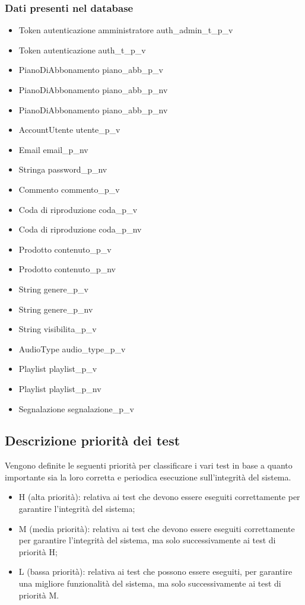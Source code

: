 \subsubsection{Dati presenti nel database}
\begin{itemize}
    \item Token autenticazione amministratore auth\_admin\_t\_p\_v
    \item Token autenticazione auth\_t\_p\_v
    \item PianoDiAbbonamento piano\_abb\_p\_v
    \item PianoDiAbbonamento piano\_abb\_p\_nv
    \item PianoDiAbbonamento piano\_abb\_p\_nv
    \item AccountUtente utente\_p\_v
    \item Email email\_p\_nv
    \item Stringa password\_p\_nv
    \item Commento commento\_p\_v
    \item Coda di riproduzione coda\_p\_v
    \item Coda di riproduzione coda\_p\_nv
    \item Prodotto contenuto\_p\_v
    \item Prodotto contenuto\_p\_nv
    \item String genere\_p\_v
    \item String genere\_p\_nv
    \item String visibilita\_p\_v
    \item AudioType audio\_type\_p\_v
    \item Playlist playlist\_p\_v
    \item Playlist playlist\_p\_nv
    \item Segnalazione segnalazione\_p\_v

\end{itemize}

\subsection{Descrizione priorità dei test}

Vengono definite le seguenti priorità per classificare i vari test in base a quanto importante sia la
loro corretta e periodica esecuzione sull'integrità del sistema.
\begin{itemize}
    \item H (alta priorità): relativa ai test che devono essere eseguiti correttamente per garantire l'integrità
          del sistema;
    \item M (media priorità): relativa ai test che devono essere eseguiti correttamente per garantire l'integrità
          del sistema, ma solo successivamente ai test di priorità H;
    \item L (bassa priorità): relativa ai test che possono essere eseguiti, per garantire una migliore funzionalità
          del sistema, ma solo successivamente ai test di priorità M.
\end{itemize}


